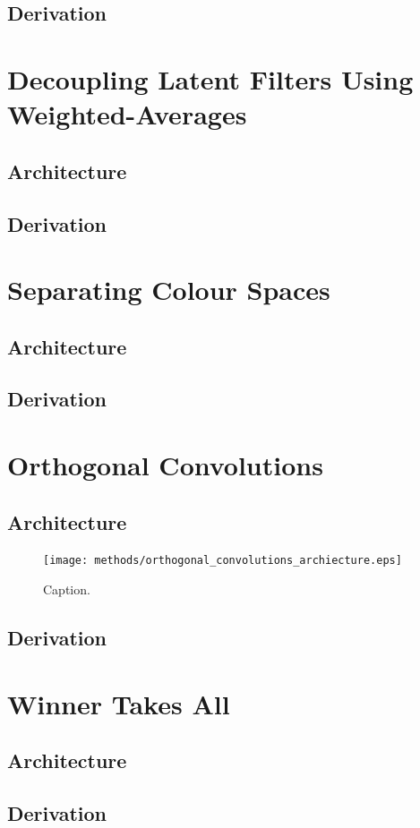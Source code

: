 \subsection{Derivation}

%
%
%
%
%
\section{Decoupling Latent Filters Using Weighted-Averages}
\lipsum[2]
\subsection{Architecture}
\subsection{Derivation}

%
%
%
%
%
\section{Separating Colour Spaces}
\lipsum[2]
\subsection{Architecture}
\subsection{Derivation}

%
%
%
%
%
\section{Orthogonal Convolutions}
\lipsum[2]
\subsection{Architecture}
\begin{figure}[h!]
\centering
\captionsetup{justification=centering}
\texttt{[image: methods/orthogonal\_convolutions\_archiecture.eps]}
\caption{Caption.}
\label{fig:orthogonal_convolutions_archiecture}
\end{figure}

\subsection{Derivation}

%
%
%
%
%
\section{Winner Takes All}
\lipsum[2]
\subsection{Architecture}
\subsection{Derivation}
